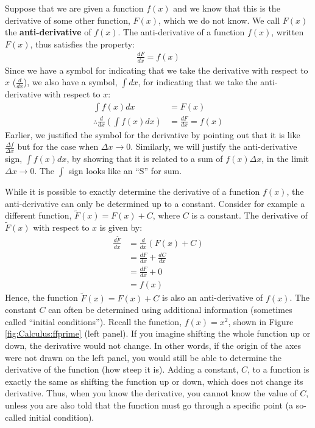 Suppose that we are given a function $f(x)$ and we know that this is the derivative of some other function, $F(x)$, which we do not know. We call $F(x)$ the \textbf{anti-derivative} of $f(x)$. The anti-derivative of a function $f(x)$, written $F(x)$, thus satisfies the property:
\begin{align*}
\frac{dF}{dx}=f(x)
\end{align*}
Since we have a symbol for indicating that we take the derivative with respect to $x$ ($\frac{d}{dx}$), we also have a symbol, $\int dx$, for indicating that we take the anti-derivative with respect to $x$:
\begin{align*}
\int f(x) dx &= F(x) \\
\therefore \frac{d}{dx}\left(\int f(x) dx\right) &= \frac{dF}{dx}=f(x)
\end{align*}
Earlier, we justified the symbol for the derivative by pointing out that it is like $\frac{\Delta f}{\Delta x}$ but for the case when $\Delta x\to 0$. Similarly, we will justify the anti-derivative sign, $\int f(x) dx$, by showing that it is related to a sum of $f(x)\Delta x$, in the limit $\Delta x\to 0$. The $\int$ sign looks like an ``S'' for sum.

While it is possible to exactly determine the derivative of a function $f(x)$, the anti-derivative can only be determined up to a constant. Consider for example a different function, $\tilde F(x)=F(x)+C$, where $C$ is a constant. The derivative of $\tilde F(x)$ with respect to $x$ is given by:
\begin{align*}
\frac{d\tilde{F}}{dx}&=\frac{d}{dx}\left(F(x)+C\right)\\
&=\frac{dF}{dx}+\frac{dC}{dx}\\
&=\frac{dF}{dx}+0\\
&=f(x)
\end{align*}
Hence, the function $\tilde F(x)=F(x)+C$ is also an anti-derivative of $f(x)$. The constant $C$ can often be determined using additional information (sometimes called ``initial conditions''). Recall the function, $f(x)=x^2$, shown in Figure \ref{fig:Calculus:ffprime} (left panel). If you imagine shifting the whole function up or down, the derivative would not change. In other words, if the origin of the axes were not drawn on the left panel, you would still be able to determine the derivative of the function (how steep it is). Adding a constant, $C$, to a function is exactly the same as shifting the function up or down, which does not change its derivative. Thus, when you know the derivative, you cannot know the value of $C$, unless you are also told that the function must go through a specific point (a so-called initial condition).

